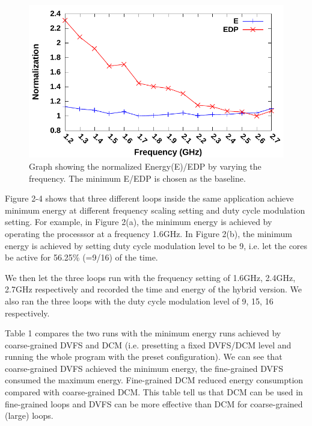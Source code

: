

\begin{figure}[bt]
    \includegraphics[width=3.in]{dvfs-all}
    \caption{Graph showing the normalized Energy(E)/EDP by varying the frequency. The minimum E/EDP is chosen as
the baseline.}
    \label{fig:cdc-fs}
\end{figure}

Figure 2-4 shows that three different loops inside the same application 
achieve minimum energy at different frequency scaling setting and duty cycle modulation setting.
For example, in Figure 2(a), the minimum energy is achieved by operating the processsor 
at a frequency 1.6GHz. In Figure 2(b), the minimum energy is achieved by setting duty cycle
modulation level to be 9, i.e. let the cores be active for 56.25\% (=9/16) of the time.

We then let the three loops run with the frequency setting of 1.6GHz, 2.4GHz,
2.7GHz respectively and recorded the time and energy of the hybrid version.
We also ran the three loops with the duty cycle modulation level of 9, 15, 16 respectively.

Table 1 compares the two runs with the minimum energy runs achieved by
 coarse-grained DVFS and DCM (i.e. presetting a fixed DVFS/DCM level and running the 
whole program with the preset configuration). We can see that coarse-grained DVFS 
achieved the minimum energy, the fine-grained DVFS consumed the maximum energy.
Fine-grained DCM reduced energy consumption compared with coarse-grained DCM. 
This table tell us that DCM can be used in fine-grained loops and DVFS can 
be more effective than DCM for coarse-grained (large) loops.



